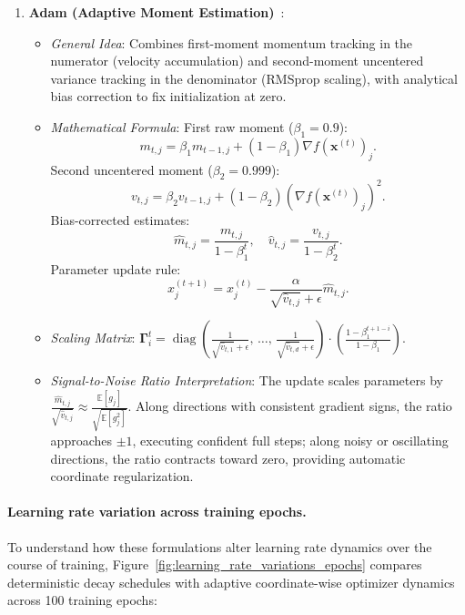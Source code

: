 \begin{enumerate}
  \item \textbf{Adam (Adaptive Moment Estimation)}~\cite{kingma2014adam}:
    \begin{itemize}[noitemsep]
      \item \textit{General Idea}: Combines first-moment momentum tracking in the numerator (velocity accumulation) and second-moment uncentered variance tracking in the denominator (RMSprop scaling), with analytical bias correction to fix initialization at zero.
      \item \textit{Mathematical Formula}:
        First raw moment ($\beta_1 = 0.9$):
        \begin{equation}
        m_{t, j} = \beta_1 m_{t-1, j} + (1 - \beta_1) \nabla f(\mathbf{x}^{(t)})_j.
        \end{equation}
        Second uncentered moment ($\beta_2 = 0.999$):
        \begin{equation}
        v_{t, j} = \beta_2 v_{t-1, j} + (1 - \beta_2) \left( \nabla f(\mathbf{x}^{(t)})_j \right)^2.
        \end{equation}
        Bias-corrected estimates:
        \begin{equation}
        \hat{m}_{t, j} = \frac{m_{t, j}}{1 - \beta_1^t}, \quad \hat{v}_{t, j} = \frac{v_{t, j}}{1 - \beta_2^t}.
        \end{equation}
        Parameter update rule:
        \begin{equation}
        x_j^{(t+1)} = x_j^{(t)} - \frac{\alpha}{\sqrt{\hat{v}_{t, j}} + \epsilon} \hat{m}_{t, j}.
        \end{equation}
      \item \textit{Scaling Matrix}: $\boldsymbol{\Gamma}_i^t = \operatorname{diag}\left( \frac{1}{\sqrt{\hat{v}_{t, 1}} + \epsilon}, \, \dots, \, \frac{1}{\sqrt{\hat{v}_{t, d}} + \epsilon} \right) \cdot \left(\frac{1 - \beta_1^{t+1-i}}{1 - \beta_1}\right)$.
      \item \textit{Signal-to-Noise Ratio Interpretation}: The update scales parameters by $\frac{\hat{m}_{t, j}}{\sqrt{\hat{v}_{t, j}}} \approx \frac{\mathbb{E}[g_j]}{\sqrt{\mathbb{E}[g_j^2]}}$. Along directions with consistent gradient signs, the ratio approaches $\pm 1$, executing confident full steps; along noisy or oscillating directions, the ratio contracts toward zero, providing automatic coordinate regularization.
    \end{itemize}
\end{enumerate}

\paragraph{Learning rate variation across training epochs.}
To understand how these formulations alter learning rate dynamics over the course of training, Figure~\ref{fig:learning_rate_variations_epochs} compares deterministic decay schedules with adaptive coordinate-wise optimizer dynamics across 100 training epochs:

